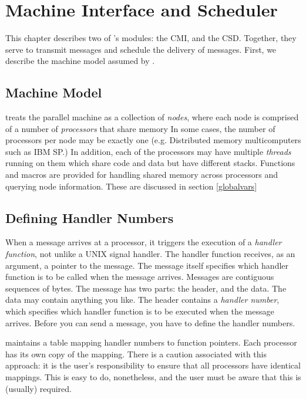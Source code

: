 \chapter{Machine Interface and Scheduler}

This chapter describes two of \converse{}'s modules: the CMI, and the
CSD.  Together, they serve to transmit messages and schedule the
delivery of messages. First, we describe the machine model assumed by
\converse{}.

\section{Machine Model}
\label{model}

\converse{} treats the parallel machine as a collection of {\em nodes}, where
each node is comprised of a number of {\em processors} that share memory 
In some cases, the number of processors per node may be exactly one  
(e.g. Distributed memory multicomputers such as IBM SP.)  
In addition, each of the processors may have multiple {\em threads} running on
them which share code and data but have different stacks.
Functions and macros are provided for handling shared memory across
processors and querying node information. These are discussed in section
\ref{globalvars}

\section{Defining Handler Numbers}
\label{handler1}

When a message arrives at a processor, it triggers the execution of a
{\em handler function}, not unlike a UNIX signal handler.  The handler
function receives, as an argument, a pointer to the message.
The message itself specifies which handler function is to be
called when the message arrives.  Messages are contiguous sequences of
bytes.  The message has two parts: the header, and the data.  The data
may contain anything you like.  The header contains a {\em handler
number}, which specifies which handler function is to be executed when
the message arrives.  Before you can send a message, you have to
define the handler numbers.

\converse{} maintains a table mapping handler numbers to function
pointers.  Each processor has its own copy of the mapping.  There is a
caution associated with this approach: it is the user's responsibility
to ensure that all processors have identical mappings.  This is easy
to do, nonetheless, and the user must be aware that this is (usually)
required.

